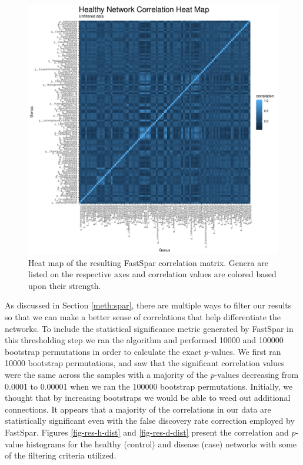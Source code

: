 \begin{figure}[!htb]
    \centering
    \includegraphics[width=1.0\linewidth]{figure/results/healthy_raw_corr_heatmap.pdf}
    \caption[Heat map of the resulting FastSpar correlation matrix.]{Heat map of the resulting FastSpar correlation matrix. Genera are listed on the respective axes and correlation values are colored based upon their strength.}
    \label{fig-h-orig-heatmap}
\end{figure}

As discussed in Section \ref{meth:spar}, there are multiple ways to filter our results so that we can make a better sense of correlations that help differentiate the networks. To include the statistical significance metric generated by FastSpar in this thresholding step we ran the algorithm and performed 10000 and 100000 bootstrap permutations in order to calculate the exact $p$-values. We first ran 10000 bootstrap permutations, and saw that the significant correlation values were the same across the samples with a majority of the $p$-values decreasing from 0.0001 to 0.00001 when we ran the 100000 bootstrap permutations. Initially, we thought that by increasing bootstraps we would be able to weed out additional connections. It appears that a majority of the correlations in our data are statistically significant even with the false discovery rate correction employed by FastSpar. Figures \ref{fig-res-h-dist} and \ref{fig-res-d-dist} present the correlation and $p$-value histograms for the healthy (control) and disease (case) networks with some of the filtering criteria utilized.

